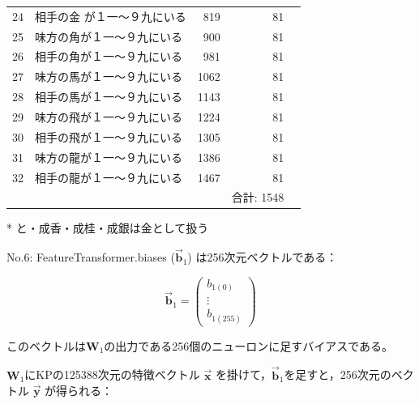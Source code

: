 \documentclass[11pt,a4paper]{ltjsarticle}
\begin{document}
\begin{table}
\begin{threeparttable}
\begin{tabular}{rlrrr}
    24 & 相手の金\tnote{*} が１一〜９九にいる &  819 & 81 \\
    25 & 味方の角が１一〜９九にいる        &  900 & 81 \\
    26 & 相手の角が１一〜９九にいる        &  981 & 81 \\
    27 & 味方の馬が１一〜９九にいる        & 1062 & 81 \\
    28 & 相手の馬が１一〜９九にいる        & 1143 & 81 \\
    29 & 味方の飛が１一〜９九にいる        & 1224 & 81 \\
    30 & 相手の飛が１一〜９九にいる        & 1305 & 81 \\
    31 & 味方の龍が１一〜９九にいる        & 1386 & 81 \\
    32 & 相手の龍が１一〜９九にいる        & 1467 & 81 \\
    \hline
       &                                   &      & 合計: 1548
  \end{tabular}
  \begin{tablenotes}
    \item[*] と・成香・成桂・成銀は金として扱う
  \end{tablenotes}
  \end{threeparttable}
  \label{table2}
\end{table}


No.6: FeatureTransformer.biases ($\vec{\bm{b}}_1$) は256次元ベクトルである：

\[
  \vec{\bm{b}}_1 =
  \left(
    \begin{array}{c}
      b_{1(0)}  \\
      \vdots \\
      b_{1(255)}
    \end{array}
  \right)
\]

\noindent
このベクトルは$\bm{W}_1$の出力である256個のニューロンに足すバイアスである。

$\bm{W}_1$にKPの125388次元の特徴ベクトル $\vec{\bm{x}}$ を掛けて，$\vec{\bm{b}}_1$を足すと，256次元のベクトル $\vec{\bm{y}}$ が得られる：
\end{document}
